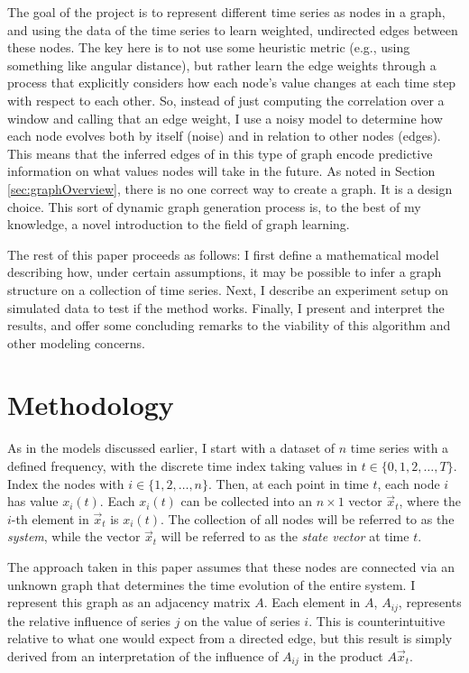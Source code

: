 \documentclass[12pt]{article}
\theoremstyle{definition}
\begin{document}
The goal of the project is to represent different time series as nodes in a graph, and using the data of the time series to learn weighted, undirected edges between these nodes. The key here is to not use some heuristic metric (e.g., using something like angular distance), but rather learn the edge weights through a process that explicitly considers how each node's value changes at each time step with respect to each other. So, instead of just computing the correlation over a window and calling that an edge weight, I use a noisy model to determine how each node evolves both by itself (noise) and in relation to other nodes (edges). This means that the inferred edges of in this type of graph encode predictive information on what values nodes will take in the future. As noted in Section \ref{sec:graphOverview}, there is no one correct way to create a graph. It is a design choice. This sort of dynamic graph generation process is, to the best of my knowledge, a novel introduction to the field of graph learning.

The rest of this paper proceeds as follows: I first define a mathematical model describing how, under certain assumptions, it may be possible to infer a graph structure on a collection of time series. Next, I describe an experiment setup on simulated data to test if the method works. Finally, I present and interpret the results, and offer some concluding remarks to the viability of this algorithm and other modeling concerns.

\section{Methodology}
\label{sec:methods}

As in the models discussed earlier, I start with a dataset of $n$ time series with a defined frequency, with the discrete time index taking values in $t \in \{0, 1, 2, \ldots, T\}$. Index the nodes with $i \in \{1, 2, \ldots, n\}$. Then, at each point in time $t$, each node $i$ has value $x_i(t)$. Each $x_i(t)$ can be collected into an $n \times 1$ vector $\vec{x}_t$, where the $i$-th element in $\vec{x}_t$ is $x_i(t)$. The collection of all nodes will be referred to as the \textit{system}, while the vector $\vec{x}_t$ will be referred to as the \textit{state vector} at time $t$.

The approach taken in this paper assumes that these nodes are connected via an unknown graph that determines the time evolution of the entire system. I represent this graph as an adjacency matrix $A$. Each element in $A$, $A_{ij}$, represents the relative influence of series $j$ on the value of series $i$. This is counterintuitive relative to what one would expect from a directed edge, but this result is simply derived from an interpretation of the influence of $A_{ij}$ in the product $A\vec{x}_t$.
\end{document}

